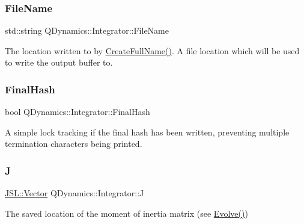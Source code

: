 \subsubsection{\texorpdfstring{File\+Name}{FileName}}
{\footnotesize\ttfamily std\+::string Q\+Dynamics\+::\+Integrator\+::\+File\+Name\hspace{0.3cm}{\ttfamily [protected]}}



The location written to by \hyperlink{classQDynamics_1_1Integrator_ae80ab509b96a9b996934d9ef127f5137}{Create\+Full\+Name()}. A file location which will be used to write the output buffer to. 

\mbox{\label{classQDynamics_1_1Integrator_ae893dd6b0d041de777e25a99f42886c3}} 
\subsubsection{\texorpdfstring{Final\+Hash}{FinalHash}}
{\footnotesize\ttfamily bool Q\+Dynamics\+::\+Integrator\+::\+Final\+Hash\hspace{0.3cm}{\ttfamily [private]}}



A simple lock tracking if the final hash has been written, preventing multiple termination characters being printed. 

\mbox{\label{classQDynamics_1_1Integrator_a7b99b22475321b34c1624bded3489954}} 
\subsubsection{\texorpdfstring{J}{J}}
{\footnotesize\ttfamily \hyperlink{classJSL_1_1Vector}{J\+S\+L\+::\+Vector} Q\+Dynamics\+::\+Integrator\+::J\hspace{0.3cm}{\ttfamily [protected]}}



The saved location of the moment of inertia matrix (see \hyperlink{classQDynamics_1_1Integrator_a4b921b312775194b77c2c85f93add84e}{Evolve()}) 

\mbox{\label{classQDynamics_1_1Integrator_adb45dae4f4d1d37ab83ca5269f51058d}} 
